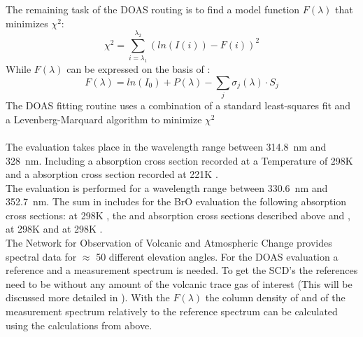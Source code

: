 The remaining task of the DOAS routing is to find a model function $F \left(\lambda\right)$ that minimizes $\chi^2$:
\begin{equation}
\chi^2 = \sum_{i=\lambda_1}^{\lambda_2}\left(ln(I(i))-F(i)\right)^2
\end{equation}
While $F\left(\lambda\right)$ can be expressed on the basis of :
\begin{equation}
F\left(\lambda\right) = ln\left(I_0 \right) + P \left(\lambda\right)-
\sum_{j}\sigma_j \left(\lambda\right) \cdot S_j
\label{eq:F}
\end{equation}
The DOAS fitting routine uses a combination of a standard least-squares fit and a Levenberg-Marquard algorithm to minimize $\chi^2$\\
\\
The  evaluation takes place in the wavelength range between 314.8~nm and 328~nm. Including a  absorption cross section recorded at a Temperature of 298K \cite{vandaele2009fourier} and a   absorption cross section recorded at 221K \cite{burrows1999atmospheric}.\\
The   evaluation is performed for a wavelength range between 330.6~nm and 352.7~nm. The sum in  includes for the BrO evaluation the following absorption cross sections:
  at 298K \cite{fleischmann2004new}, the  and   absorption cross sections described above and   \cite{hermans2003absorption},   at 298K \cite{vandaele1998measurements} and   at 298K \cite{meller2000temperature}.\\
%
The Network for Observation of Volcanic and Atmospheric Change provides spectral data for $\approx$ 50 different elevation angles. For the DOAS evaluation a reference and a measurement spectrum is needed. To get the SCD's the references need to be without any amount of the volcanic trace gas of interest (This will be discussed more detailed in ). With the $F\left(\lambda\right)$ the column density of    and  of the measurement spectrum relatively to the reference spectrum can be calculated using the calculations from above. \\
\\
